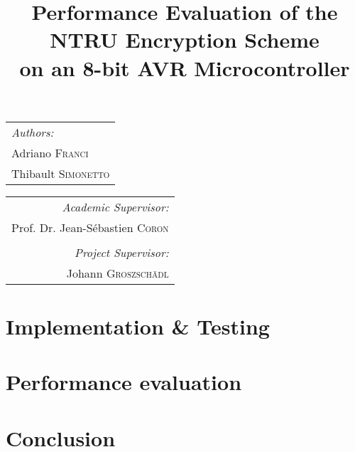 \documentclass[11pt,a4paper]{article}
\begin{document}
\title{Performance Evaluation of the NTRU Encryption Scheme\\ on an 8-bit AVR 
Microcontroller}
\maketitle

\begin{tabular}[t]{@{}l} 
	\textit{Authors:}\\
	Adriano \textsc{Franci}\\
	Thibault \textsc{Simonetto}\\
\end{tabular}
\hfill
\begin{tabular}[t]{r@{}}
	\textit{Academic Supervisor:}\\
	Prof. Dr. Jean-S\'ebastien \textsc{Coron}\\
	\vspace{1em}\\
	\textit{Project Supervisor:}\\
	Johann \textsc{Groszsch\"adl}\\
\end{tabular}






\section{Implementation \& Testing}
\section{Performance evaluation}
\section{Conclusion}




\end{document}

